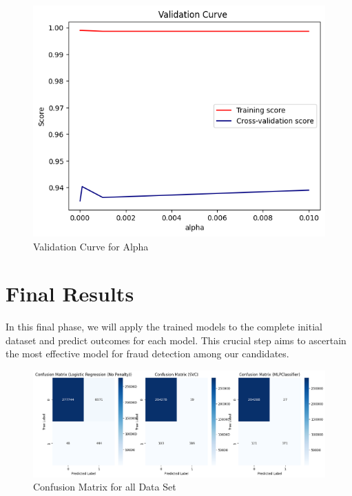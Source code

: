 \documentclass[conference]{IEEEtran}
\begin{document}
\begin{figure}[H]
    \centering
    \includegraphics[width=1\linewidth]{images/ValidationCurveNNAlpha.png}
    \caption{Validation Curve for Alpha}
    \label{fig:NN-Confusion-AllFeatures}
\end{figure}

\section{Final Results}

In this final phase, we will apply the trained models to the complete initial dataset and predict outcomes for each model. This crucial step aims to ascertain the most effective model for fraud detection among our candidates.

\begin{figure}[H]
    \centering
    \includegraphics[width=1\linewidth]{images/ConfusionMatrixAllData.png}
    \caption{Confusion Matrix for all Data Set}
    \label{fig:NN-Confusion-AllFeatures}
\end{figure}
\end{document}
